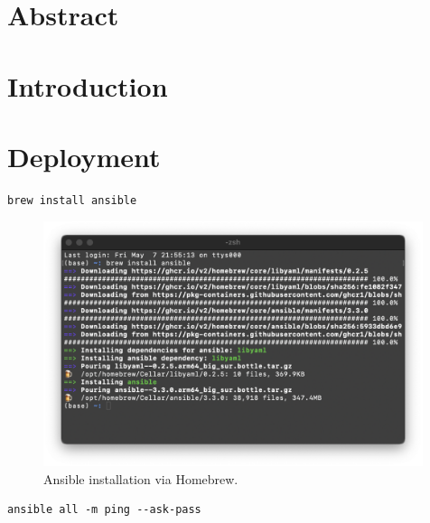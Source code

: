 \documentclass{article}
\begin{document}
\hypersetup{
    linkcolor=CrispBlue,
    urlcolor=CrispBlue,
    breaklinks=true
}
\section{Abstract}


\section{Introduction}






\section{Deployment}

\begin{tcolorbox}[colback=CrispBlue!5!white,colframe=CrispBlue!75!black,title=Ansible installation via Homebrew]
\begin{verbatim}
brew install ansible
\end{verbatim}
\end{tcolorbox}

\begin{figure}[ht]
    \centering
    \includegraphics[width=0.99\textwidth]{Ansible-install.png}
    \vspace{-2em}\caption{Ansible installation via Homebrew.}
    \label{fig:Ansible-install}
\end{figure}



\begin{tcolorbox}[colback=CrispBlue!5!white,colframe=CrispBlue!75!black,title=Ansible installation verification]
\begin{verbatim}
ansible all -m ping --ask-pass
\end{verbatim}
\end{tcolorbox}
\end{document}
